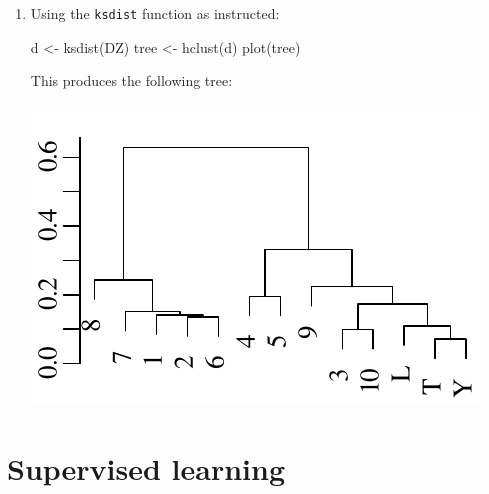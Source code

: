 \begin{enumerate}
\item Using the \texttt{ksdist} function as instructed:

\begin{script}
d <- ksdist(DZ)
tree <- hclust(d)
plot(tree)
\end{script}

This produces the following tree:

\noindent\begin{minipage}[t][][b]{.35\linewidth}
\includegraphics[width=\textwidth]{../figures/DZtree.pdf}\medskip
\end{minipage}
\begin{minipage}[t][][t]{.65\linewidth}
  \label{fig:DZtree}
\end{minipage}

\end{enumerate}

\section{Supervised learning}
\label{sec:sol-supervised}

